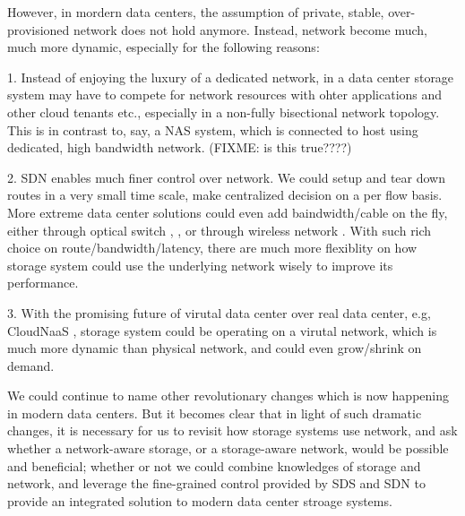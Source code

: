 However, in mordern data centers, the assumption of private, stable, over-provisioned network does not hold anymore. Instead, network become much, much more dynamic, especially for the following reasons:

\item{
}

1. Instead of enjoying the luxury of a dedicated network, in a data center storage system may have to compete for network resources with ohter applications and other cloud tenants etc., especially in a non-fully bisectional network topology. This is in contrast to, say, a NAS system, which is connected to host using dedicated, high bandwidth network. (FIXME: is this true????)

2. SDN enables much finer control over network. We could setup and tear down routes in a very small time scale, make centralized decision on a per flow basis. More extreme data center solutions could even add baindwidth/cable on the fly, either through optical switch \cite{c-through}, \cite{Hellio}, or through wireless network \cite{flyways}. With such rich choice on route/bandwidth/latency, there are much more flexiblity on how storage system could use the underlying network wisely to improve its performance.

3. With the promising future of virutal data center over real data center, e.g, CloudNaaS \cite{cloud-naas}, storage system could be operating on a virutal network, which is much more dynamic than physical network, and could even grow/shrink on demand.

We could continue to name other revolutionary changes which is now happening in modern data centers. But it becomes clear that in light of such dramatic changes, it is necessary for us to revisit how storage systems use network, and ask whether a network-aware storage, or a storage-aware network, would be possible and beneficial; whether or not we could combine knowledges of storage and network, and leverage the fine-grained control provided by SDS and SDN to provide an integrated solution to modern data center stroage systems.

